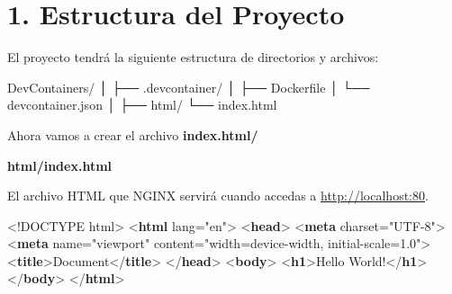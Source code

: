 \documentclass[
  a4paper,
  DIV=11,
  numbers=noendperiod,
  onepage,
  openany]{scrreprt}
\newenvironment{Shaded}{\begin{snugshade}}{\end{snugshade}}
\newcommand{\DataTypeTok}[1]{\textcolor[rgb]{0.68,0.00,0.00}{#1}}
\newcommand{\KeywordTok}[1]{\textcolor[rgb]{0.00,0.23,0.31}{\textbf{#1}}}
\newcommand{\NormalTok}[1]{\textcolor[rgb]{0.00,0.23,0.31}{#1}}
\newcommand{\OperatorTok}[1]{\textcolor[rgb]{0.37,0.37,0.37}{#1}}
\newcommand{\OtherTok}[1]{\textcolor[rgb]{0.00,0.23,0.31}{#1}}
\newcommand{\StringTok}[1]{\textcolor[rgb]{0.13,0.47,0.30}{#1}}
\begin{document}
\section{1. Estructura del Proyecto}\label{estructura-del-proyecto}

El proyecto tendrá la siguiente estructura de directorios y archivos:

\begin{Shaded}
\begin{Highlighting}[]
\NormalTok{DevContainers/}
\NormalTok{│}
\NormalTok{├── .devcontainer/}
\NormalTok{│   ├── Dockerfile}
\NormalTok{│   └── devcontainer.json}
\NormalTok{│}
\NormalTok{├── html/}
\NormalTok{    └── index.html}
\end{Highlighting}
\end{Shaded}

Ahora vamos a crear el archivo \textbf{index.html/}

\textbf{html/index.html}

El archivo HTML que NGINX servirá cuando accedas a
\url{http://localhost:80}.

\begin{Shaded}
\begin{Highlighting}[]
\DataTypeTok{\textless{}!DOCTYPE}\NormalTok{ html}\DataTypeTok{\textgreater{}}
\DataTypeTok{\textless{}}\KeywordTok{html}\OtherTok{ lang}\OperatorTok{=}\StringTok{"en"}\DataTypeTok{\textgreater{}}
\DataTypeTok{\textless{}}\KeywordTok{head}\DataTypeTok{\textgreater{}}
    \DataTypeTok{\textless{}}\KeywordTok{meta}\OtherTok{ charset}\OperatorTok{=}\StringTok{"UTF{-}8"}\DataTypeTok{\textgreater{}}
    \DataTypeTok{\textless{}}\KeywordTok{meta}\OtherTok{ name}\OperatorTok{=}\StringTok{"viewport"}\OtherTok{ content}\OperatorTok{=}\StringTok{"width=device{-}width, initial{-}scale=1.0"}\DataTypeTok{\textgreater{}}
    \DataTypeTok{\textless{}}\KeywordTok{title}\DataTypeTok{\textgreater{}}\NormalTok{Document}\DataTypeTok{\textless{}/}\KeywordTok{title}\DataTypeTok{\textgreater{}}
\DataTypeTok{\textless{}/}\KeywordTok{head}\DataTypeTok{\textgreater{}}
\DataTypeTok{\textless{}}\KeywordTok{body}\DataTypeTok{\textgreater{}}
    \DataTypeTok{\textless{}}\KeywordTok{h1}\DataTypeTok{\textgreater{}}\NormalTok{Hello World!}\DataTypeTok{\textless{}/}\KeywordTok{h1}\DataTypeTok{\textgreater{}}
\DataTypeTok{\textless{}/}\KeywordTok{body}\DataTypeTok{\textgreater{}}
\DataTypeTok{\textless{}/}\KeywordTok{html}\DataTypeTok{\textgreater{}}
\end{Highlighting}
\end{Shaded}
\end{document}
